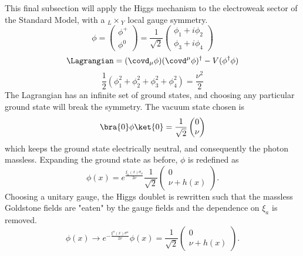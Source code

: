 This final subsection will apply the Higgs mechanism to the electroweak sector of the Standard Model, with a $_L\times$$_Y$ local gauge symmetry. 
\begin{equation}
    \phi=
    \begin{pmatrix}
         \phi^+ \\
         \phi^0
    \end{pmatrix}
    =\dfrac{1}{\sqrt{2}}
    \begin{pmatrix}
         \phi_1+i\phi_2\\
         \phi_3+i\phi_4
    \end{pmatrix}
\end{equation}
\begin{equation} \label{eq:higgsLagr}
    \Lagrangian=(\covd_{\mu}\phi)(\covd^{\mu}\phi)^{\dagger}-V(\phi^{\dagger}\phi)
\end{equation}
\begin{equation}
    \dfrac{1}{2}(\phi_{1}^2+\phi_{2}^2+\phi_{3}^2+\phi_{4}^2)=\dfrac{\nu^2}{2}
\end{equation}
The Lagrangian has an infinite set of ground states, and choosing any particular ground state will break the symmetry. The vacuum state chosen is
\begin{equation}
    \bra{0}\phi\ket{0}=\dfrac{1}{\sqrt{2}}
    \begin{pmatrix}
         0 \\
         \nu
    \end{pmatrix}
\end{equation}
which keeps the ground state electrically neutral, and consequently the photon massless. Expanding the ground state as before, $\phi$ is redefined as 
\begin{equation}
    \phi(x) = e^{\frac{\xi_a(x)\sigma_a}{2\nu}}\dfrac{1}{\sqrt{2}}
    \begin{pmatrix}
         0\\
         \nu+h(x)
    \end{pmatrix}.
\end{equation}
Choosing a unitary gauge, the Higgs doublet is rewritten such that the massless Goldstone fields are "eaten" by the gauge fields and the dependence on $\xi_a$ is removed.
\begin{equation} \label{eq:higgsvev}
    \phi(x)\rightarrow e^{-\frac{\xi^a(x)\sigma^a}{2\nu}}\phi(x)=\dfrac{1}{\sqrt{2}}
    \begin{pmatrix}
         0\\
         \nu+h(x)
    \end{pmatrix}.
\end{equation}
